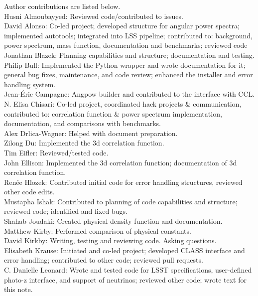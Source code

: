 Author contributions are listed below. \\
Husni Almoubayyed: Reviewed code/contributed to issues. \\
David Alonso: Co-led project; developed structure for angular power spectra; implemented autotools; integrated into LSS pipeline; contributed to: background, power spectrum, mass function, documentation and benchmarks; reviewed code \\
Jonathan Blazek: Planning capabilities and structure; documentation and testing. \\
Philip Bull: Implemented the Python wrapper and wrote documentation for it; general bug fixes, maintenance, and code review; enhanced the installer and error handling system. \\
Jean-\'Eric Campagne: Angpow builder and contributed to the interface with CCL. \\
N. Elisa Chisari: Co-led project, coordinated hack projects \& communication, contributed to: correlation function \& power spectrum implementation, documentation, and comparisons with benchmarks. \\
Alex Drlica-Wagner: Helped with document preparation. \\
Zilong Du: Implemented the 3d correlation function. \\
Tim Eifler: Reviewed/tested code. \\
John Ellison: Implemented the 3d correlation function; documentation of 3d correlation function. \\
Ren\'ee Hlozek: Contributed initial code for error handling structures, reviewed other code edits. \\
Mustapha Ishak: Contributed to planning of code capabilities and structure; reviewed code; identified and fixed bugs. \\
Shahab Joudaki: Created physical density function and documentation. \\
Matthew Kirby: Performed comparison of physical constants. \\
David Kirkby: Writing, testing and reviewing code. Asking questions. \\
Elisabeth Krause: Initiated and co-led project; developed CLASS interface and error handling; contributed to other code; reviewed pull requests. \\
C. Danielle Leonard: Wrote and tested code for LSST specifications, user-defined photo-z interface, and support of neutrinos; reviewed other code; wrote text for this note. \\
